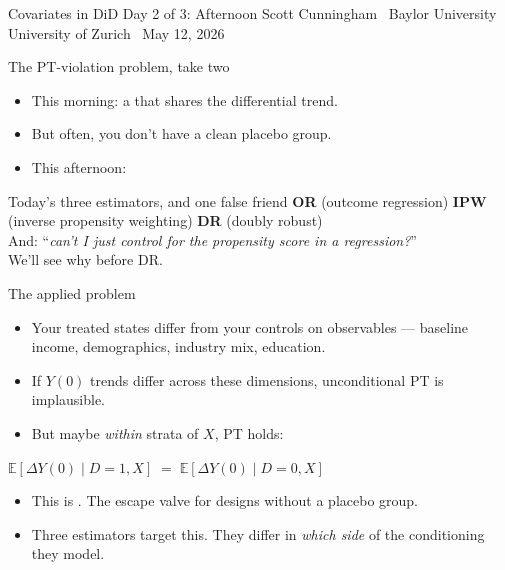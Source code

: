 \documentclass[aspectratio=169,11pt]{beamer}
\begin{document}

\remixtitleframe
  {Covariates in DiD}
  {Day 2 of 3: Afternoon}
  {Scott Cunningham \textperiodcentered\ Baylor University}
  {University of Zurich \textperiodcentered\ May 12, 2026}

\begin{frame}{The PT-violation problem, take two}
\vspace{0.5em}
\begin{itemize}
  \item This morning: a  that shares the differential trend.
  \item But often, you don't have a clean placebo group.
  \item This afternoon: 
\end{itemize}
\vspace{0.6em}
\begin{block}{Today's three estimators, and one false friend}
\small
\textbf{OR} (outcome regression) \;\; \textbf{IPW} (inverse propensity weighting) \;\; \textbf{DR} (doubly robust) \\[0.3em]
And: ``\textit{can't I just control for the propensity score in a regression?}'' \\
 We'll see why before DR.
\end{block}
\end{frame}

\begin{frame}{The applied problem}
\vspace{0.5em}
\begin{itemize}
  \item Your treated states differ from your controls on observables --- baseline income, demographics, industry mix, education.
  \item If $Y(0)$ trends differ across these dimensions, unconditional PT is implausible.
  \item But maybe \textit{within} strata of $X$, PT holds:
\end{itemize}
\vspace{0.4em}
\begin{center}
\small
$\mathbb{E}[\Delta Y(0) \mid D=1, X] \;=\; \mathbb{E}[\Delta Y(0) \mid D=0, X]$
\end{center}
\vspace{0.5em}
\begin{itemize}
  \item This is . The escape valve for designs without a placebo group.
  \item Three estimators target this. They differ in \textit{which side} of the conditioning they model.
\end{itemize}
\end{frame}
\end{document}
